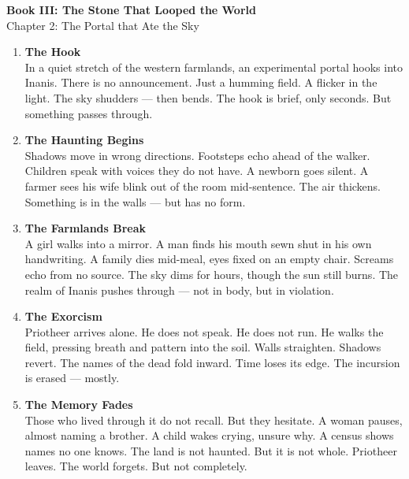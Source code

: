 \documentclass[9pt]{article}
\begin{document}
\begin{center}
    \Large\textbf{Book III: The Stone That Looped the World} \\
    \large Chapter 2: The Portal that Ate the Sky\\
\end{center}

\vspace{1in}


\begin{enumerate}
    \item \textbf{The Hook} \\
    In a quiet stretch of the western farmlands, an experimental portal hooks into Inanis. There is no announcement. Just a humming field. A flicker in the light. The sky shudders — then bends. The hook is brief, only seconds. But something passes through.

    \vspace{1em}
    \item \textbf{The Haunting Begins} \\
    Shadows move in wrong directions. Footsteps echo ahead of the walker. Children speak with voices they do not have. A newborn goes silent. A farmer sees his wife blink out of the room mid-sentence. The air thickens. Something is in the walls — but has no form.

    \vspace{1em}
    \item \textbf{The Farmlands Break} \\
    A girl walks into a mirror. A man finds his mouth sewn shut in his own handwriting. A family dies mid-meal, eyes fixed on an empty chair. Screams echo from no source. The sky dims for hours, though the sun still burns. The realm of Inanis pushes through — not in body, but in violation.

    \vspace{1em}
    \item \textbf{The Exorcism} \\
    Priotheer arrives alone. He does not speak. He does not run. He walks the field, pressing breath and pattern into the soil. Walls straighten. Shadows revert. The names of the dead fold inward. Time loses its edge. The incursion is erased — mostly.

    \vspace{1em}
    \item \textbf{The Memory Fades} \\
    Those who lived through it do not recall. But they hesitate. A woman pauses, almost naming a brother. A child wakes crying, unsure why. A census shows names no one knows. The land is not haunted. But it is not whole. Priotheer leaves. The world forgets. But not completely.


\end{enumerate}
\end{document}
